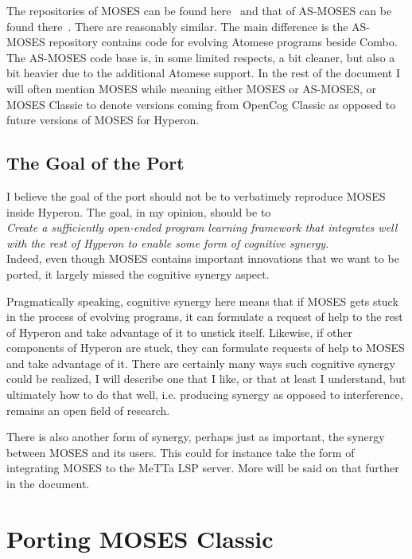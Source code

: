 \documentclass[]{report}
\begin{document}
The repositories of MOSES can be found here~\cite{MOSES} and that of
AS-MOSES can be found there~\cite{ASMOSES}.  There are reasonably
similar.  The main difference is the AS-MOSES repository contains code
for evolving Atomese programs beside Combo.  The AS-MOSES code base
is, in some limited respects, a bit cleaner, but also a bit heavier
due to the additional Atomese support.  In the rest of the document I
will often mention MOSES while meaning either MOSES or AS-MOSES, or
MOSES Classic to denote versions coming from OpenCog Classic as
opposed to future versions of MOSES for Hyperon.

\section{The Goal of the Port}

I believe the goal of the port should not be to verbatimely reproduce
MOSES inside Hyperon.  The goal, in my opinion, should be to\\

\emph{Create a sufficiently open-ended program learning framework that
integrates well with the rest of Hyperon to enable some form of
cognitive synergy}.\\

Indeed, even though MOSES contains important innovations that we want
to be ported, it largely missed the cognitive synergy aspect.

Pragmatically speaking, cognitive synergy here means that if MOSES
gets stuck in the process of evolving programs, it can formulate a
request of help to the rest of Hyperon and take advantage of it to
unstick itself.  Likewise, if other components of Hyperon are stuck,
they can formulate requests of help to MOSES and take advantage of it.
There are certainly many ways such cognitive synergy could be
realized, I will describe one that I like, or that at least I
understand, but ultimately how to do that well, i.e. producing synergy
as opposed to interference, remains an open field of research.

There is also another form of synergy, perhaps just as important, the
synergy between MOSES and its users.  This could for instance take the
form of integrating MOSES to the MeTTa LSP server.  More will be said
on that further in the document.

\chapter{Porting MOSES Classic}
\label{chap:portmoses}
\end{document}
